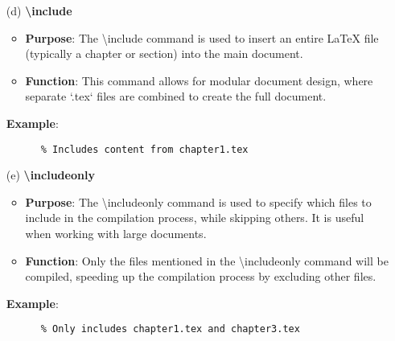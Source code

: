 \begin{enumerate}
\begin{verbatim}
    \chapter{Appendix}
    
    \end{verbatim}

    \item[(d)] \textbf{\textbackslash include}
    \begin{itemize}
        \item \textbf{Purpose}: The \textbackslash include command is used to insert an entire LaTeX file (typically a chapter or section) into the main document.
        \item \textbf{Function}: This command allows for modular document design, where separate `.tex` files are combined to create the full document.
    \end{itemize}
    \textbf{Example}:
    \begin{verbatim}
      % Includes content from chapter1.tex
    \end{verbatim}

    \item[(e)] \textbf{\textbackslash includeonly}
    \begin{itemize}
        \item \textbf{Purpose}: The \textbackslash includeonly command is used to specify which files to include in the compilation process, while skipping others. It is useful when working with large documents.
        \item \textbf{Function}: Only the files mentioned in the \textbackslash includeonly command will be compiled, speeding up the compilation process by excluding other files.
    \end{itemize}
    \textbf{Example}:
    \begin{verbatim}
      % Only includes chapter1.tex and chapter3.tex
    \end{verbatim}
\end{enumerate}
